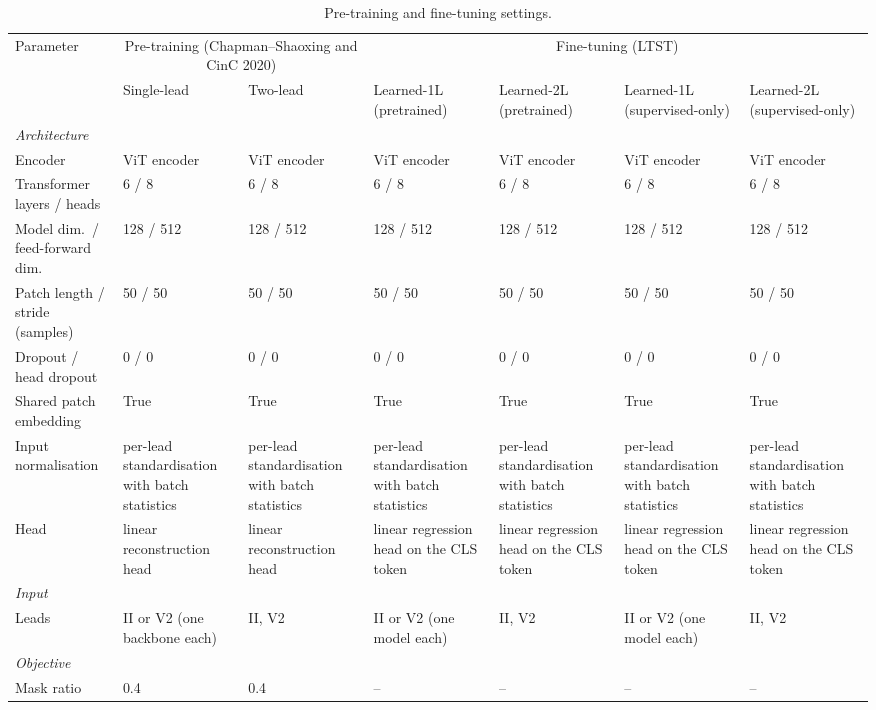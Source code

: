 \begin{table}[htbp]
\centering
\scriptsize
\caption{Pre-training and fine-tuning settings.}
\label{tab:appendix_hyperparams}
\begin{tabular}{p{3.0cm}p{2.3cm}p{1.6cm}p{1.9cm}p{1.9cm}p{1.9cm}p{1.9cm}}
\toprule
Parameter & \multicolumn{2}{c}{Pre-training (Chapman--Shaoxing and CinC 2020)} & \multicolumn{4}{c}{Fine-tuning (LTST)} \\
 & Single-lead & Two-lead & Learned-1L (pretrained) & Learned-2L (pretrained) & Learned-1L (supervised-only) & Learned-2L (supervised-only) \\
\midrule
\multicolumn{7}{l}{\textit{Architecture}} \\
Encoder & ViT encoder & ViT encoder & ViT encoder & ViT encoder & ViT encoder & ViT encoder \\
Transformer layers / heads & 6 / 8 & 6 / 8 & 6 / 8 & 6 / 8 & 6 / 8 & 6 / 8 \\
Model dim.\ / feed-forward dim. & 128 / 512 & 128 / 512 & 128 / 512 & 128 / 512 & 128 / 512 & 128 / 512 \\
Patch length / stride (samples) & 50 / 50 & 50 / 50 & 50 / 50 & 50 / 50 & 50 / 50 & 50 / 50 \\
Dropout / head dropout & 0 / 0 & 0 / 0 & 0 / 0 & 0 / 0 & 0 / 0 & 0 / 0 \\
Shared patch embedding & True & True & True & True & True & True \\
Input normalisation & per-lead standardisation with batch statistics & per-lead standardisation with batch statistics & per-lead standardisation with batch statistics & per-lead standardisation with batch statistics & per-lead standardisation with batch statistics & per-lead standardisation with batch statistics \\
Head & linear reconstruction head & linear reconstruction head & linear regression head on the CLS token & linear regression head on the CLS token & linear regression head on the CLS token & linear regression head on the CLS token \\
\midrule
\multicolumn{7}{l}{\textit{Input}} \\
Leads & II or V2 (one backbone each) & II, V2 & II or V2 (one model each) & II, V2 & II or V2 (one model each) & II, V2 \\
\midrule
\multicolumn{7}{l}{\textit{Objective}} \\
Mask ratio & 0.4 & 0.4 & -- & -- & -- & -- \\

\end{tabular}
\end{table}
